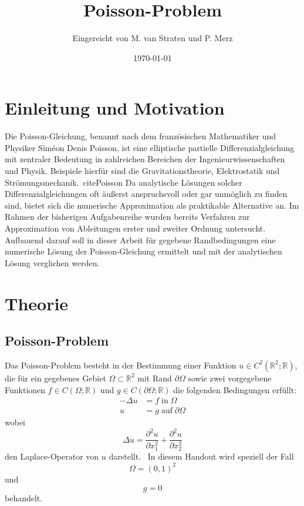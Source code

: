 \documentclass{scrartcl}
\title{Poisson-Problem}
\author{%
  Eingereicht von M. van Straten und P. Merz
}
\date{\today}
\newcommand\R{\mathbb{R}}
\begin{document}
\maketitle
\tableofcontents
\cleardoublepage%

\section{Einleitung und Motivation}

Die Poisson-Gleichung, benannt nach dem französischen Mathematiker und Physiker
Siméon Denis Poisson, ist eine elliptische partielle Differenzialgleichung mit
zentraler Bedeutung in zahlreichen Bereichen der Ingenieurwissenschaften und
Physik. Beispiele hierfür sind die Gravitationstheorie, Elektrostatik und
Strömungsmechanik.\ cite{Poisson} Da analytische Lösungen solcher
Differenzialgleichungen oft äußerst anspruchsvoll oder gar unmöglich zu finden
sind, bietet sich die numerische Approximation als praktikable Alternative an.
Im Rahmen der bisherigen Aufgabenreihe wurden bereits Verfahren zur
Approximation von Ableitungen erster und zweiter Ordnung untersucht. Aufbauend
darauf soll in dieser Arbeit für gegebene Randbedingungen eine numerische
Lösung der Poisson-Gleichung ermittelt und mit der analytischen Lösung
verglichen werden.

\section{Theorie}

\subsection{Poisson-Problem}

Das Poisson-Problem besteht in der Bestimmung einer Funktion \(u \in C^2(\R^2;
\R)\), die für ein gegebenes Gebiet \(\Omega \subset \R^2\) mit Rand \(\partial
\Omega\) sowie zwei vorgegebene Funktionen \(f \in C(\Omega; \R)\) und \(g \in
C(\partial \Omega; \R)\) die folgenden Bedingungen erfüllt:
\begin{align*}
    -\Delta u & = f \; \text{in} \; \Omega           \\
    u         & = g \; \text{auf} \; \partial \Omega
\end{align*}
wobei
\begin{equation*}
    \Delta u = \frac{\partial^2 u}{\partial x_1^2} + \frac{\partial^2 u}{\partial x_2^2}
\end{equation*}
den Laplace-Operator von \(u\) darstellt.\ \cite{PPI_Poisson} In diesem
Handout wird speziell der Fall \[\Omega = {(0, 1)}^2\] und \[g = 0\] behandelt.
\end{document}
